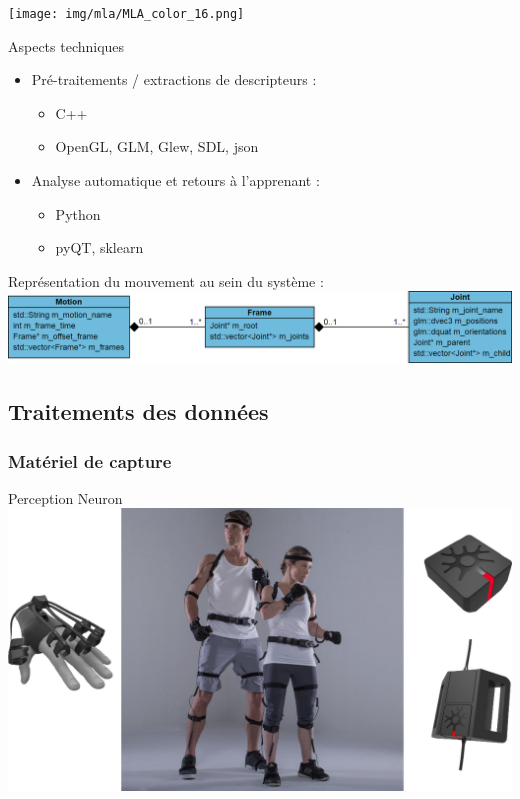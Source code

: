 \documentclass[svgnames]{beamer}
\newcommand{\nonumberingframe}[1]{\begin{frame}{#1}\addtocounter{framenumber}{-1}}
\begin{document}
	\nonumberingframe{\subsubsecname}
	\centering
		\texttt{[image: img/mla/MLA\_color\_16.png]}
	\end{frame}
	
	\begin{frame}{Aspects techniques}
		\begin{itemize}[label=$\bullet$]
			\item Pré-traitements / extractions de descripteurs :
			\begin{itemize}[label=$-$]
				\item C++
				\item OpenGL, GLM, Glew, SDL, json
			\end{itemize}
			\item Analyse automatique et retours à l'apprenant : 
			\begin{itemize}[label=$-$]
				\item Python
				\item pyQT, sklearn
			\end{itemize}
		\end{itemize}		
		\vspace{1cm}
		
		Représentation du mouvement au sein du système :
		\centering
		\includegraphics[scale=0.35]{img/class_diagram_motion_MLA.png}
	\end{frame}

	\subsection{Traitements des données}
	
	\subsubsection{Matériel de capture}
	\begin{frame}{Perception Neuron}
		\centering
		\includegraphics[scale=0.4]{img/Perception_Neuron.png}
	\end{frame}
	
\end{document}
